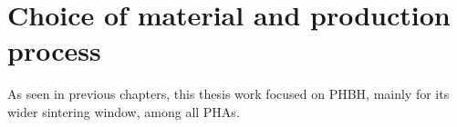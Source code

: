 \documentclass{article}
\begin{document}
%
%
%
%
%



    \clearpage
    \section{Choice of material and production process\label{Choice_material_process}}

    As seen in previous chapters, this thesis work focused on PHBH, mainly for its wider sintering window, among all PHAs. \\ 
\end{document}

